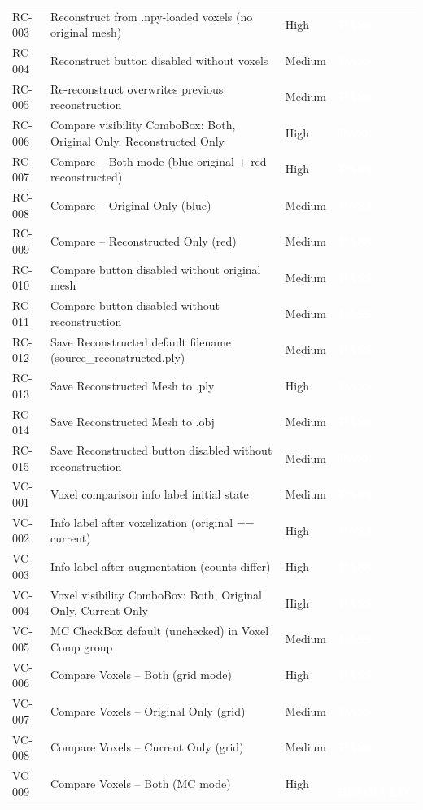 \documentclass[12pt,a4paper]{article}
\newcommand{\statuspass}{\colorbox{statusgreen}{\textcolor{white}{\textbf{\,PASS\,}}}}
\newcommand{\statusresolved}{\colorbox{statusorange}{\textcolor{white}{\textbf{\,RESOLVED\,}}}}
\begin{document}
{\begin{longtable}{p{1.7cm}p{7.7cm}p{1.3cm}p{2cm}}
RC-003 & Reconstruct from .npy-loaded voxels (no original mesh) & High & \statuspass \\
RC-004 & Reconstruct button disabled without voxels & Medium & \statuspass \\
RC-005 & Re-reconstruct overwrites previous reconstruction & Medium & \statuspass \\
RC-006 & Compare visibility ComboBox: Both, Original Only, Reconstructed Only & High & \statuspass \\
RC-007 & Compare -- Both mode (blue original + red reconstructed) & High & \statuspass \\
RC-008 & Compare -- Original Only (blue) & Medium & \statuspass \\
RC-009 & Compare -- Reconstructed Only (red) & Medium & \statuspass \\
RC-010 & Compare button disabled without original mesh & Medium & \statuspass \\
RC-011 & Compare button disabled without reconstruction & Medium & \statuspass \\
RC-012 & Save Reconstructed default filename (source\_reconstructed.ply) & Medium & \statuspass \\
RC-013 & Save Reconstructed Mesh to .ply & High & \statuspass \\
RC-014 & Save Reconstructed Mesh to .obj & Medium & \statuspass \\
RC-015 & Save Reconstructed button disabled without reconstruction & Medium & \statuspass \\
VC-001 & Voxel comparison info label initial state & Medium & \statuspass \\
VC-002 & Info label after voxelization (original == current) & High & \statuspass \\
VC-003 & Info label after augmentation (counts differ) & High & \statuspass \\
VC-004 & Voxel visibility ComboBox: Both, Original Only, Current Only & High & \statuspass \\
VC-005 & MC CheckBox default (unchecked) in Voxel Comp group & Medium & \statuspass \\
VC-006 & Compare Voxels -- Both (grid mode) & High & \statuspass \\
VC-007 & Compare Voxels -- Original Only (grid) & Medium & \statuspass \\
VC-008 & Compare Voxels -- Current Only (grid) & Medium & \statuspass \\
VC-009 & Compare Voxels -- Both (MC mode) & High & \statusresolved \\

\end{longtable}}
\end{document}
